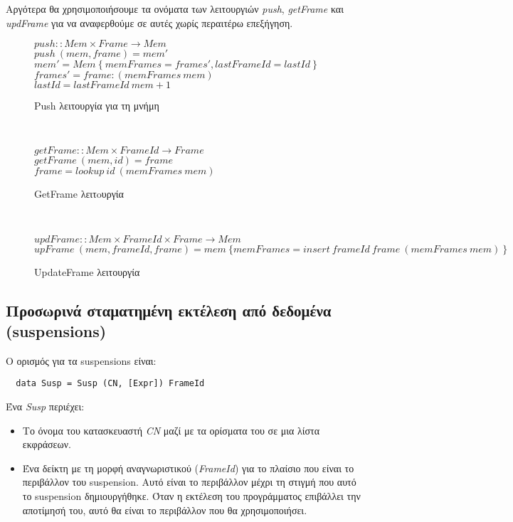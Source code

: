 \documentclass[diploma]{softlab-thesis}
\begin{document}
Αργότερα θα χρησιμοποιήσουμε τα ονόματα των λειτουργιών 
\textit{push}, \textit{getFrame} και \textit{updFrame} για να αναφερθούμε σε αυτές χωρίς περαιτέρω επεξήγηση. 


\begin{figure}[htp]
  $ \mathit{push} :: \mathit{Mem \times Frame \rightarrow Mem} $ \\
  $ \mathit{push~(mem, frame) = mem'} $ \\
  $ \mathit{mem' = Mem~\{~memFrames = frames', lastFrameId = lastId~\} } $ \\
  $ \mathit{frames' = frame : (memFrames~mem)} $ \\
  $ \mathit{lastId = lastFrameId~mem + 1} $
\caption{Push λειτουργία για τη μνήμη\label{fig:pushEL}}
\end{figure}~
\begin{figure}[htp]
  $ \mathit{getFrame} :: \mathit{Mem \times FrameId \rightarrow Frame} $ \\
  $ \mathit{getFrame~(mem, id) = frame} $ \\
  $ \mathit{frame = lookup~id~(memFrames~mem)} $
\caption{GetFrame λειτoυργία\label{fig:getFrameEL}}
\end{figure}~
\begin{figure}[htp]
  $ \mathit{updFrame} :: \mathit{Mem \times FrameId \times Frame \rightarrow Mem} $ \\
  $ \mathit{upFrame~(mem, frameId, frame) = 
      mem~\{memFrames = insert~frameId~frame~(memFrames~mem)~\} } $ 
\caption{UpdateFrame λειτουργία\label{fig:updFrameEL}}
\end{figure}


\subsection{Προσωρινά σταματημένη εκτέλεση από δεδομένα (suspensions)}

Ο ορισμός για τα  suspensions είναι:
\begin{verbatim}
  data Susp = Susp (CN, [Expr]) FrameId
\end{verbatim}

Ένα \textit{Susp} περιέχει:
\begin{itemize}
  \item Το όνομα του κατασκευαστή \textit{CN} μαζί με τα ορίσματα του σε μια λίστα εκφράσεων. 
  \item Ένα δείκτη με τη μορφή αναγνωριστικού (\textit{FrameId}) για το πλαίσιο που είναι το περιβάλλον του suspension.
Αυτό είναι το περιβάλλον μέχρι τη στιγμή που αυτό το suspension δημιουργήθηκε. Όταν η εκτέλεση του προγράμματος επιβάλλει την αποτίμησή του,
αυτό θα είναι το περιβάλλον που θα χρησιμοποιήσει.
\end{itemize}
\end{document}
